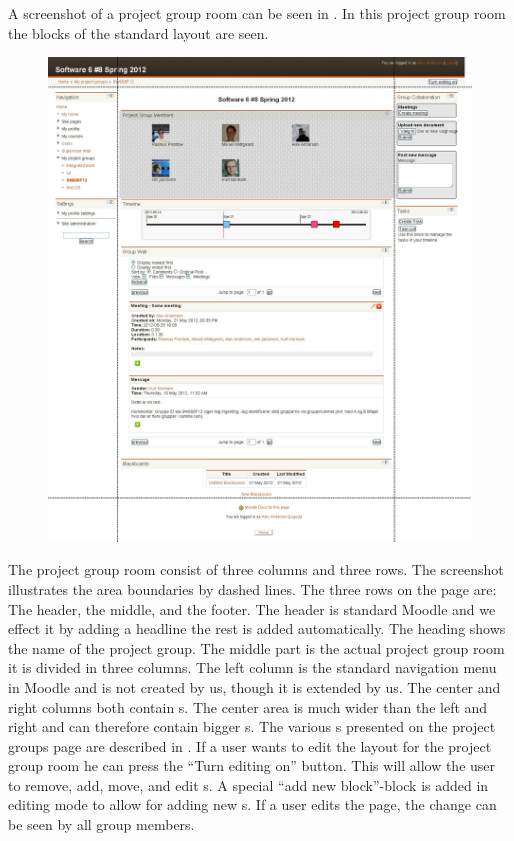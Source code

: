 

A screenshot of a project group room can be seen in . 
In this project group room the blocks of the standard layout are seen.
\begin{figure}[h]
	\centering
		\includegraphics[width=\textwidth]{images/projectgroupnoedit.png}
	\label{fig:projectgroupnoedit}
\end{figure}

The project group room consist of three columns and three rows. 
The screenshot illustrates the area boundaries by dashed lines. 
The three rows on the page are: The header, the middle, and the footer. 
The header is standard Moodle and we effect it by adding a headline the rest is added automatically.
The heading shows the name of the project group. 
The middle part is the actual project group room it is divided in three columns. 
The left column is the standard navigation menu in Moodle and is not created by us, though it is extended by us.
The center and right columns both contain \block{}s.
The center area is much wider than the left and right and can therefore contain bigger \block{}s. 
The various \block{}s presented on the project groups page are described in . 
If a user wants to edit the layout for the project group room he can press the ``Turn editing on'' button. 
This will allow the user to remove, add, move, and edit \block{}s. 
A special ``add new block''-block is added in editing mode to allow for adding new \block{}s. 
If a user edits the page, the change can be seen by all group members. 


